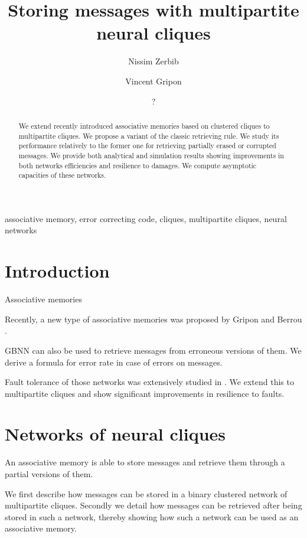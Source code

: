 \documentclass[english,10pt,twocolumn]{IEEEtran}
\title{Storing messages with multipartite neural cliques}
\author[]{Nissim Zerbib}
\affil{Département d'Informatique, École normale supérieure, Paris, France}
\author[]{Vincent Gripon}
\affil{Département d'Électronique, Télécom Bretagne, Brest, France}
\author{?}
\date{
	}
\theoremstyle{definition}
\begin{document}
	\maketitle

	 \begin{abstract}
	 	We extend recently introduced associative memories based on clustered cliques to multipartite cliques. We propose a variant of the classic retrieving rule. We study its performance relatively to the former one for retrieving partially erased or corrupted messages. We provide both analytical and simulation results showing improvements in both networks efficiencies and resilience to damages. We compute asymptotic capacities of these networks.
	 \end{abstract}
	 
	
	\begin{IEEEkeywords}
	associative memory, error correcting code, cliques, multipartite cliques, neural networks
	\end{IEEEkeywords}
	\section{Introduction}
	
		
		Associative memories
		
		Recently, a new type of associative memories was proposed by Gripon and Berrou \cite{GriBer20117}.
		
		GBNN can also be used to retrieve messages from erroneous versions of them. We derive a formula for error rate in case of errors on messages.
		
		Fault tolerance of those networks was extensively studied in \cite{LedGriRabGro20145}. We extend this to multipartite cliques and show significant improvements in resilience to faults.
	
	
	\section{Networks of neural cliques}
	
	An associative memory is able to store messages and retrieve them through a partial versions of them.

	We first describe how messages can be stored in a binary clustered network of multipartite cliques. Secondly we detail how messages can be retrieved after being stored in such a network, thereby showing how such a network can be used as an associative memory.
	
\end{document}
